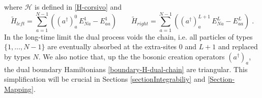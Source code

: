 \documentclass[10pt]{article}
\numberwithin{equation}{section}
\numberwithin{equation}{subsection}
\newcommand{\dt}{\;.}
\begin{document}
where $\mathcal{H}$ is defined in \eqref{H-corsivo} and 
\begin{equation}\label{boundary-H-dual-chain}
	\widetilde{H}_{left}=\sum_{a=1}^{N-1}\left((a^{\dagger})_{a}^{0}\,E_{Na}^{1}-E_{aa}^{1}\right)\qquad 	\widetilde{H}_{right}=\sum_{a=1}^{N-1}\left((a^{\dagger})_{a}^{L+1}\,E_{Na}^{L}-E_{aa}^{L}\right)\dt
\end{equation}
In the long-time limit the dual process voids the chain, i.e. all particles of types $\{1,\ldots,N-1\}$ are eventually absorbed at the extra-sites $0$ and $L+1$ and replaced by types $N$. We also notice that, up the the bosonic creation operators $(a^{\dagger})_{a}$, the dual boundary Hamiltonians \eqref{boundary-H-dual-chain} are triangular. This simplification will be crucial in Sections \ref{sectionIntegrabiliy} and \ref{Section-Mapping}.\\
\end{document}
